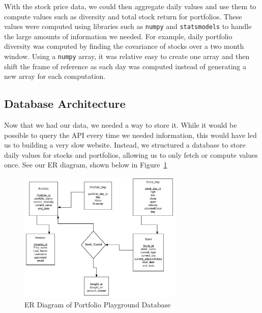 \documentclass{article}
\begin{document}
With the stock price data, we could then aggregate daily values and use them to compute values such as diversity and total stock return for portfolios.  These values were computed using libraries such as \texttt{numpy} and \texttt{statsmodels} to handle the large amounts of information we needed.  For example, daily portfolio diversity was computed by finding the covariance of stocks over a two month window.  Using a \texttt{numpy} array, it was relative easy to create one array and then shift the frame of reference as each day was computed instead of generating a new array for each computation.

\subsection{Database Architecture}
Now that we had our data, we needed a way to store it.  While it would be possible to query the API every time we needed information, this would have led us to building a very slow website.  Instead, we structured a database to store daily values for stocks and portfolios, allowing us to only fetch or compute values once.  See our ER diagram, shown below in Figure~\ref{fig:db_diagram}

\begin{figure}[H]
\begin{center}
\includegraphics[width=0.7\textwidth]{db_diagram}
\caption{\label{fig:db_diagram} ER Diagram of Portfolio Playground Database}
\end{center}
\end{figure}
\end{document}
